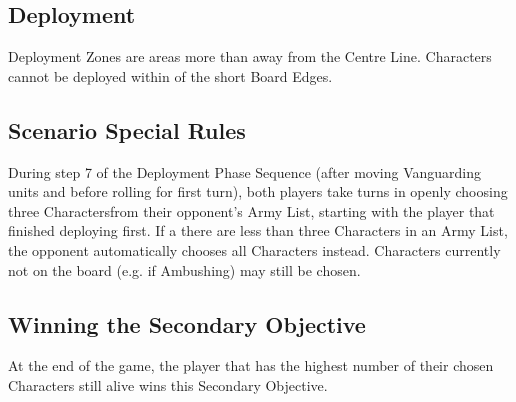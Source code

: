 
\label{TheAdversarysTask}


\subsection*{Deployment}

Deployment Zones are areas more than  away from the Centre Line. Characters cannot be deployed within  of the short Board Edges.


\subsection*{Scenario Special Rules}

During step 7 of the Deployment Phase Sequence (after moving Vanguarding units and before rolling for first turn), both players take turns in openly choosing three Charactersfrom their opponent's Army List, starting with the player that finished deploying first. If a there are less than three Characters in an Army List, the opponent automatically chooses all Characters instead. Characters currently not on the board (e.g. if Ambushing) may still be chosen.

\subsection*{Winning the Secondary Objective}

At the end of the game, the player that has the highest number of their chosen Characters still alive wins this Secondary Objective.

